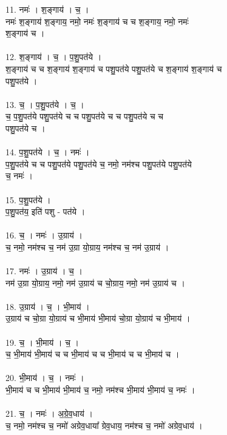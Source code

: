 11. नमः॑ । श॒ङ्गाय॑ । च॒ ।\\
नमः॑ श॒ङ्गाय॑ श॒ङ्गाय॒ नमो॒ नमः॑ श॒ङ्गाय॑ च च श॒ङ्गाय॒ नमो॒ नमः॑\\
श॒ङ्गाय॑ च ।\\
\\
12. श॒ङ्गाय॑ । च॒ । प॒शु॒पत॑ये ।\\
श॒ङ्गाय॑ च च श॒ङ्गाय॑ श॒ङ्गाय॑ च पशु॒पत॑ये पशु॒पत॑ये च श॒ङ्गाय॑ श॒ङ्गाय॑ च\\
पशु॒पत॑ये ।\\
\\
13. च॒ । प॒शु॒पत॑ये । च॒ ।\\
च॒ प॒शु॒पत॑ये पशु॒पत॑ये च च पशु॒पत॑ये च च पशु॒पत॑ये च च\\
पशु॒पत॑ये च ।\\
\\
14. प॒शु॒पत॑ये । च॒ । नमः॑ ।\\
प॒शु॒पत॑ये च च पशु॒पत॑ये पशु॒पत॑ये च॒ नमो॒ नम॑श्च पशु॒पत॑ये पशु॒पत॑ये\\
च॒ नमः॑ ।\\
\\
15. प॒शु॒पत॑ये ।\\
प॒शु॒पत॑य॒ इति॑ पशु - पत॑ये ।\\
\\
16. च॒ । नमः॑ । उ॒ग्राय॑ ।\\
च॒ नमो॒ नम॑श्च च॒ नम॑ उ॒ग्रा यो॒ग्राय॒ नम॑श्च च॒ नम॑ उ॒ग्राय॑ ।\\
\\
17. नमः॑ । उ॒ग्राय॑ । च॒ ।\\
नम॑ उ॒ग्रा यो॒ग्राय॒ नमो॒ नम॑ उ॒ग्राय॑ च चो॒ग्राय॒ नमो॒ नम॑ उ॒ग्राय॑ च ।\\
\\
18. उ॒ग्राय॑ । च॒ । भी॒माय॑ ।\\
उ॒ग्राय॑ च चो॒ग्रा यो॒ग्राय॑ च भी॒माय॑ भी॒माय॑ चो॒ग्रा यो॒ग्राय॑ च भी॒माय॑ ।\\
\\
19. च॒ । भी॒माय॑ । च॒ ।\\
च॒ भी॒माय॑ भी॒माय॑ च च भी॒माय॑ च च भी॒माय॑ च च भी॒माय॑ च ।\\
\\
20. भी॒माय॑ । च॒ । नमः॑ ।\\
भी॒माय॑ च च भी॒माय॑ भी॒माय॑ च॒ नमो॒ नम॑श्च भी॒माय॑ भी॒माय॑ च॒ नमः॑ ।\\
\\
21. च॒ । नमः॑ । अ॒ग्रे॒व॒धाय॑ ।\\
च॒ नमो॒ नम॑श्च च॒ नमो॑ अग्रेव॒धाया᳚ ग्रेव॒धाय॒ नम॑श्च च॒ नमो॑ अग्रेव॒धाय॑ ।\\
\\
